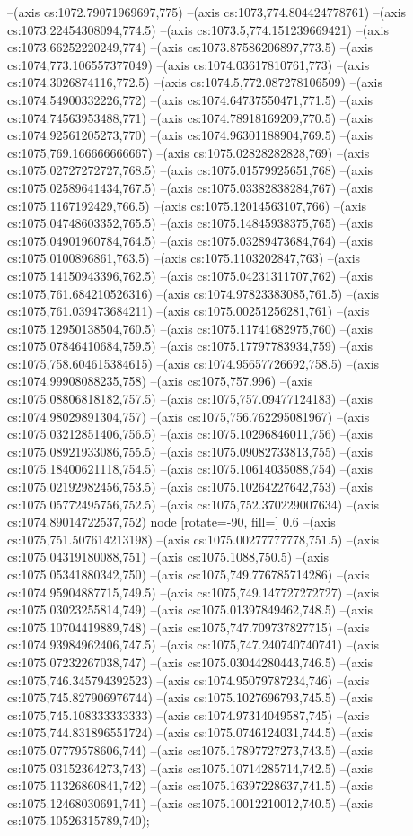 --(axis cs:1072.79071969697,775)
--(axis cs:1073,774.804424778761)
--(axis cs:1073.22454308094,774.5)
--(axis cs:1073.5,774.151239669421)
--(axis cs:1073.66252220249,774)
--(axis cs:1073.87586206897,773.5)
--(axis cs:1074,773.106557377049)
--(axis cs:1074.03617810761,773)
--(axis cs:1074.3026874116,772.5)
--(axis cs:1074.5,772.087278106509)
--(axis cs:1074.54900332226,772)
--(axis cs:1074.64737550471,771.5)
--(axis cs:1074.74563953488,771)
--(axis cs:1074.78918169209,770.5)
--(axis cs:1074.92561205273,770)
--(axis cs:1074.96301188904,769.5)
--(axis cs:1075,769.166666666667)
--(axis cs:1075.02828282828,769)
--(axis cs:1075.02727272727,768.5)
--(axis cs:1075.01579925651,768)
--(axis cs:1075.02589641434,767.5)
--(axis cs:1075.03382838284,767)
--(axis cs:1075.1167192429,766.5)
--(axis cs:1075.12014563107,766)
--(axis cs:1075.04748603352,765.5)
--(axis cs:1075.14845938375,765)
--(axis cs:1075.04901960784,764.5)
--(axis cs:1075.03289473684,764)
--(axis cs:1075.0100896861,763.5)
--(axis cs:1075.1103202847,763)
--(axis cs:1075.14150943396,762.5)
--(axis cs:1075.04231311707,762)
--(axis cs:1075,761.684210526316)
--(axis cs:1074.97823383085,761.5)
--(axis cs:1075,761.039473684211)
--(axis cs:1075.00251256281,761)
--(axis cs:1075.12950138504,760.5)
--(axis cs:1075.11741682975,760)
--(axis cs:1075.07846410684,759.5)
--(axis cs:1075.17797783934,759)
--(axis cs:1075,758.604615384615)
--(axis cs:1074.95657726692,758.5)
--(axis cs:1074.99908088235,758)
--(axis cs:1075,757.996)
--(axis cs:1075.08806818182,757.5)
--(axis cs:1075,757.09477124183)
--(axis cs:1074.98029891304,757)
--(axis cs:1075,756.762295081967)
--(axis cs:1075.03212851406,756.5)
--(axis cs:1075.10296846011,756)
--(axis cs:1075.08921933086,755.5)
--(axis cs:1075.09082733813,755)
--(axis cs:1075.18400621118,754.5)
--(axis cs:1075.10614035088,754)
--(axis cs:1075.02192982456,753.5)
--(axis cs:1075.10264227642,753)
--(axis cs:1075.05772495756,752.5)
--(axis cs:1075,752.370229007634)
--(axis cs:1074.89014722537,752) node [rotate=-90, fill=\bgcol] {0.6}
--(axis cs:1075,751.507614213198)
--(axis cs:1075.00277777778,751.5)
--(axis cs:1075.04319180088,751)
--(axis cs:1075.1088,750.5)
--(axis cs:1075.05341880342,750)
--(axis cs:1075,749.776785714286)
--(axis cs:1074.95904887715,749.5)
--(axis cs:1075,749.147727272727)
--(axis cs:1075.03023255814,749)
--(axis cs:1075.01397849462,748.5)
--(axis cs:1075.10704419889,748)
--(axis cs:1075,747.709737827715)
--(axis cs:1074.93984962406,747.5)
--(axis cs:1075,747.240740740741)
--(axis cs:1075.07232267038,747)
--(axis cs:1075.03044280443,746.5)
--(axis cs:1075,746.345794392523)
--(axis cs:1074.95079787234,746)
--(axis cs:1075,745.827906976744)
--(axis cs:1075.1027696793,745.5)
--(axis cs:1075,745.108333333333)
--(axis cs:1074.97314049587,745)
--(axis cs:1075,744.831896551724)
--(axis cs:1075.0746124031,744.5)
--(axis cs:1075.07779578606,744)
--(axis cs:1075.17897727273,743.5)
--(axis cs:1075.03152364273,743)
--(axis cs:1075.10714285714,742.5)
--(axis cs:1075.11326860841,742)
--(axis cs:1075.16397228637,741.5)
--(axis cs:1075.12468030691,741)
--(axis cs:1075.10012210012,740.5)
--(axis cs:1075.10526315789,740);

